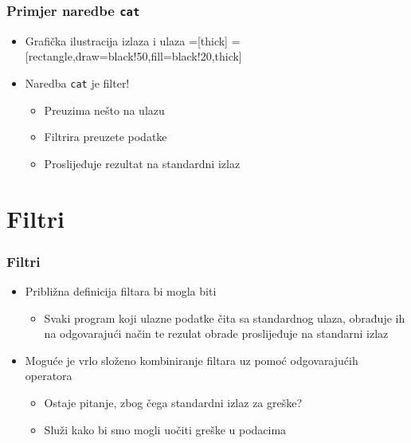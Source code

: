 \documentclass{beamer}
\newcommand{\shell}[1]{\texttt{#1}}
\begin{document}
\begin{frame}[t]
\frametitle{Primjer naredbe \shell{cat}}
\begin{itemize}
  \item Grafička ilustracija izlaza i ulaza
  \vspace{1cm}
  =[thick]
  =[rectangle,draw=black!50,fill=black!20,thick]
  \vspace{1cm}
  \item Naredba \shell{cat} je filter!
  \begin{itemize}
    \item Preuzima nešto na ulazu
    \item Filtrira preuzete podatke
    \item Proslijeđuje rezultat na standardni izlaz
  \end{itemize}
\end{itemize}
\end{frame}

\section{Filtri}
\begin{frame}[t]
\frametitle{Filtri}
\begin{itemize}
  \item Približna definicija filtara bi mogla biti
  \begin{itemize}
    \footnotesize
    \item[] Svaki program koji ulazne podatke čita sa standardnog ulaza, 
            obrađuje ih na odgovarajući način te rezulat obrade 
            proslijeđuje na standarni izlaz
    \normalsize
  \end{itemize}
  \item Moguće je vrlo složeno kombiniranje filtara uz pomoć odgovarajućih
        operatora
  \begin{itemize}
    \item Ostaje pitanje, zbog čega standardni izlaz za greške?
    \item Služi kako bi smo mogli uočiti greške u podacima
  \end{itemize}
\end{itemize}
\end{frame}
\end{document}
